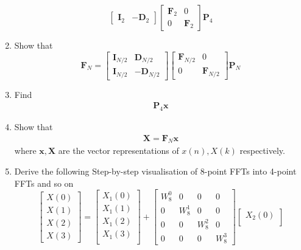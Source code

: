 \documentclass[journal,12pt,twocolumn]{IEEEtran}
\let\vec\mathbf
\numberwithin{equation}{section}
\renewcommand\thesection{\arabic{section}}
\begin{document}
\begin{enumerate}[label=\arabic*.,ref=\thesection.\theenumi]
\begin{equation}
\begin{bmatrix}
\vec{I}_{2} & -\vec{D}_{2}
\end{bmatrix}
\begin{bmatrix}
\vec{F}_{2} & 0 \\
0 & \vec{F}_{2}
\end{bmatrix}
\vec{P}_{4}
\end{equation}
\item Show that 
\begin{equation}
\vec{F}_{N}=
\begin{bmatrix}
\vec{I}_{N/2} & \vec{D}_{N/2} \\
\vec{I}_{N/2} & -\vec{D}_{N/2}
\end{bmatrix}
\begin{bmatrix}
\vec{F}_{N/2} & 0 \\
0 & \vec{F}_{N/2}
\end{bmatrix}
\vec{P}_{N}
\end{equation}
\item Find 
    \begin{align}
	     \vec{P}_4 \vec{x}
    \end{align}
\item Show that 
    \begin{align}
	    \vec{X} = \vec{F}_N \vec{x}
	    \label{eq:dft-mat-def}
    \end{align}
		where $\vec{x}, \vec{X}$ are the vector representations of $x(n), X(k)$ respectively.
\item Derive the following Step-by-step visualisation  of
8-point FFTs into 4-point FFTs and so on
\begin{equation}
\begin{bmatrix}
X(0) \\ 
X(1) \\ 
X(2) \\ 
X(3)
\end{bmatrix}
=
\begin{bmatrix}
X_{1}(0) \\ 
X_{1}(1)\\ 
X_{1}(2)\\
X_{1}(3)\\
\end{bmatrix}
+
\begin{bmatrix}
W^{0}_{8} & 0 & 0 & 0\\
0 & W^{1}_{8} & 0 & 0\\
0 & 0 & W^{2}_{8} & 0\\
0 & 0 & 0 & W^{3}_{8}
\end{bmatrix}
\begin{bmatrix}
X_{2}(0) \\ 

\end{bmatrix}
\end{equation}
\end{enumerate}
\end{document}
